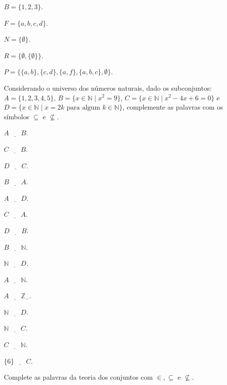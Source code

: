 \begin{exerList}
	\item $B = \{1, 2, 3\}$.
	\item $F = \{a, b, c, d\}$.
	\item $N = \{\emptyset\}$.
	\item $R = \{\emptyset, \{\emptyset\}\}$.
	\item $P = \{\{a, b\}, \{c, d\}, \{a, f\}, \{a, b, c\}, \emptyset\}$.
\end{exerList}

\begin{questao}\label{test:Conjuntos6}
	Considerando o universo dos números naturais, dado os subconjuntos:  $A = \{1, 2, 3, 4, 5\}$, $B = \{x \in \mathbb{N} \mid x^2 = 9\}$, $C = \{x \in \mathbb{N} \mid x^2 - 4x + 6 = 0\}$ e $D = \{x \in \mathbb{N} \mid  x = 2k \mbox{ para algum } k \in \mathbb{N}\}$, complemente as palavras com os símbolos $\subseteq$ e $\not\subseteq$.
\end{questao}

\begin{exerList}
	\item $A \ \underline{ \ \ \ \ \ \ } \ B$.
	\item $C \ \underline{ \ \ \ \ \ \ } \ B$.
	\item $D \ \underline{ \ \ \ \ \ \ } \ C$.
	\item $B \ \underline{ \ \ \ \ \ \ } \ A$.
	\item $A \ \underline{ \ \ \ \ \ \ } \ D$.
	\item $C \ \underline{ \ \ \ \ \ \ } \ A$.
	\item $D \ \underline{ \ \ \ \ \ \ } \ B$.
	\item $B \ \underline{ \ \ \ \ \ \ } \ \mathbb{N}$.
	\item $\mathbb{N} \ \underline{ \ \ \ \ \ \ } \ D$.
	\item $A \ \underline{ \ \ \ \ \ \ } \ \mathbb{N}$.
	\item $A \ \underline{ \ \ \ \ \ \ } \ \mathbb{Z}_-$.
	\item $\mathbb{N} \ \underline{ \ \ \ \ \ \ } \ D$.
	\item $\mathbb{N} \ \underline{ \ \ \ \ \ \ } \ C$.
	\item $C \ \underline{ \ \ \ \ \ \ } \ \mathbb{N}$.
	\item $\{6\} \ \underline{ \ \ \ \ \ \ } \ C$.
\end{exerList}

\begin{questao}\label{test:Conjuntos7}
	Complete as palavras da teoria dos conjuntos com $\in, \subseteq$ e $\not\subseteq$.
\end{questao}

